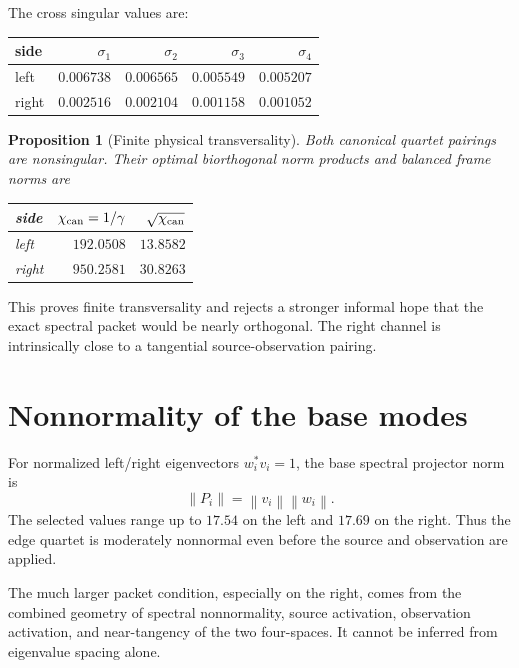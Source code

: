 \documentclass[12pt]{article}
\newtheorem{proposition}{Proposition}[section]
\theoremstyle{remark}
\newcommand{\norm}[1]{\left\lVert#1\right\rVert}
\begin{document}
The cross singular values are:
\begin{center}
\small
\begin{tabular}{lrrrr}
\toprule
side & $\sigma_1$ & $\sigma_2$ & $\sigma_3$ & $\sigma_4$\\
\midrule
left & $0.006738$ & $0.006565$ & $0.005549$ & $0.005207$\\
right & $0.002516$ & $0.002104$ & $0.001158$ & $0.001052$\\
\bottomrule
\end{tabular}
\end{center}

\begin{proposition}[Finite physical transversality]\label{prop:transverse}
Both canonical quartet pairings are nonsingular.  Their optimal
biorthogonal norm products and balanced frame norms are
\begin{center}
\begin{tabular}{lrr}
\toprule
side & $\chi_{\rm can}=1/\gamma$ & $\sqrt{\chi_{\rm can}}$\\
\midrule
left & $192.0508$ & $13.8582$\\
right & $950.2581$ & $30.8263$\\
\bottomrule
\end{tabular}
\end{center}
\end{proposition}

This proves finite transversality and rejects a stronger informal hope that
the exact spectral packet would be nearly orthogonal.  The right channel is
intrinsically close to a tangential source-observation pairing.

\section{Nonnormality of the base modes}

For normalized left/right eigenvectors $w_i^*v_i=1$, the base spectral
projector norm is
\begin{equation}\label{eq:projector-norm}
 \norm{P_i}=\norm{v_i}\norm{w_i}.
\end{equation}
The selected values range up to $17.54$ on the left and $17.69$ on the
right.  Thus the edge quartet is moderately nonnormal even before the source
and observation are applied.

The much larger packet condition, especially on the right, comes from the
combined geometry of spectral nonnormality, source activation, observation
activation, and near-tangency of the two four-spaces.  It cannot be inferred
from eigenvalue spacing alone.
\end{document}
